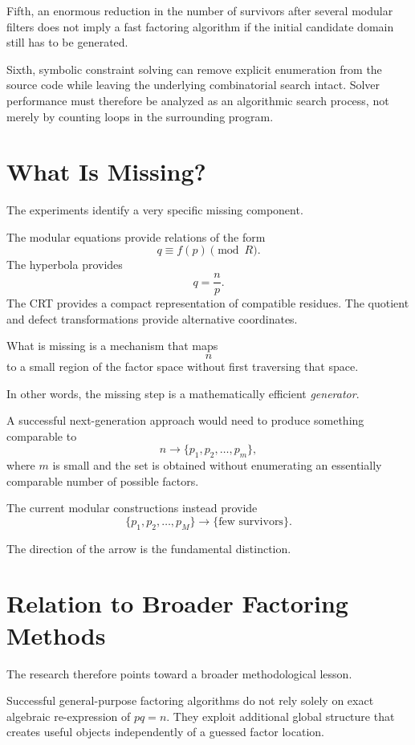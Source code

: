 \documentclass[11pt,a4paper]{article}
\begin{document}
Fifth, an enormous reduction in the number of survivors after several modular filters does not imply a fast factoring algorithm if the initial candidate domain still has to be generated.

Sixth, symbolic constraint solving can remove explicit enumeration from the source code while leaving the underlying combinatorial search intact. Solver performance must therefore be analyzed as an algorithmic search process, not merely by counting loops in the surrounding program.

\section{What Is Missing?}

The experiments identify a very specific missing component.

The modular equations provide relations of the form
\[
    q\equiv f(p)\pmod R.
\]
The hyperbola provides
\[
    q=\frac np.
\]
The CRT provides a compact representation of compatible residues. The quotient and defect transformations provide alternative coordinates.

What is missing is a mechanism that maps
\[
    n
\]
to a small region of the factor space without first traversing that space.

In other words, the missing step is a mathematically efficient \emph{generator}.

A successful next-generation approach would need to produce something comparable to
\[
    n
    \longrightarrow
    \{p_1,p_2,\ldots,p_m\},
\]
where $m$ is small and the set is obtained without enumerating an essentially comparable number of possible factors.

The current modular constructions instead provide
\[
    \{p_1,p_2,\ldots,p_M\}
    \longrightarrow
    \{\text{few survivors}\}.
\]

The direction of the arrow is the fundamental distinction.

\section{Relation to Broader Factoring Methods}

The research therefore points toward a broader methodological lesson.

Successful general-purpose factoring algorithms do not rely solely on exact algebraic re-expression of $pq=n$. They exploit additional global structure that creates useful objects independently of a guessed factor location.
\end{document}
